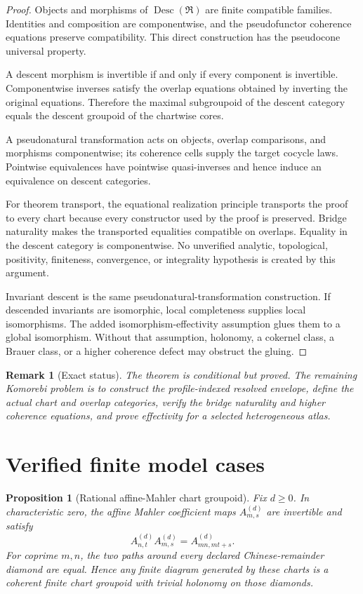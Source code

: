 \documentclass[11pt]{article}
\newtheorem{proposition}[definition]{Proposition}
\newtheorem{remark}[definition]{Remark}
\newcommand{\Desc}{\operatorname{Desc}}
\begin{document}
\begin{proof}
Objects and morphisms of $\Desc(\mathfrak R)$ are finite compatible families.  Identities and composition are componentwise, and the pseudofunctor coherence equations preserve compatibility.  This direct construction has the pseudocone universal property.

A descent morphism is invertible if and only if every component is invertible.  Componentwise inverses satisfy the overlap equations obtained by inverting the original equations.  Therefore the maximal subgroupoid of the descent category equals the descent groupoid of the chartwise cores.

A pseudonatural transformation acts on objects, overlap comparisons, and morphisms componentwise; its coherence cells supply the target cocycle laws.  Pointwise equivalences have pointwise quasi-inverses and hence induce an equivalence on descent categories.

For theorem transport, the equational realization principle transports the proof to every chart because every constructor used by the proof is preserved.  Bridge naturality makes the transported equalities compatible on overlaps.  Equality in the descent category is componentwise.  No unverified analytic, topological, positivity, finiteness, convergence, or integrality hypothesis is created by this argument.

Invariant descent is the same pseudonatural-transformation construction.  If descended invariants are isomorphic, local completeness supplies local isomorphisms.  The added isomorphism-effectivity assumption glues them to a global isomorphism.  Without that assumption, holonomy, a cokernel class, a Brauer class, or a higher coherence defect may obstruct the gluing.
\end{proof}

\begin{remark}[Exact status]
The theorem is conditional but proved.  The remaining Komorebi problem is to construct the profile-indexed resolved envelope, define the actual chart and overlap categories, verify the bridge naturality and higher coherence equations, and prove effectivity for a selected heterogeneous atlas.
\end{remark}

\section{Verified finite model cases}

\begin{proposition}[Rational affine-Mahler chart groupoid]
Fix $d\ge0$.  In characteristic zero, the affine Mahler coefficient maps $A_{m,s}^{(d)}$ are invertible and satisfy
\[
A_{n,t}^{(d)}A_{m,s}^{(d)}=A_{mn,mt+s}^{(d)}.
\]
For coprime $m,n$, the two paths around every declared Chinese-remainder diamond are equal.  Hence any finite diagram generated by these charts is a coherent finite chart groupoid with trivial holonomy on those diamonds.
\end{proposition}
\end{document}

